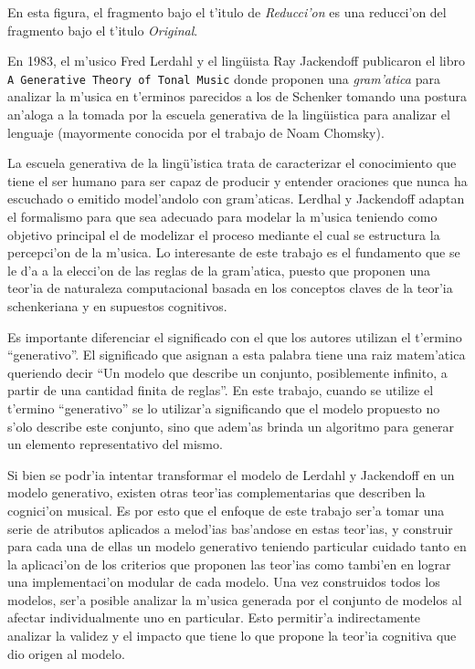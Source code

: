 En esta figura, el fragmento bajo el t'itulo de \emph{Reducci'on} es una reducci'on del fragmento bajo el t'itulo \emph{Original}.

%

En 1983, el m'usico Fred Lerdahl y el ling\"uista Ray Jackendoff publicaron el libro 
\texttt{A Generative Theory of Tonal Music} \citep{LerdahlJackendoff83} donde proponen una \emph{gram'atica} para analizar la m'usica en 
t'erminos parecidos a los de Schenker tomando una postura an'aloga a la tomada por la escuela generativa de la ling\"uistica para analizar el lenguaje 
(mayormente conocida por el trabajo de Noam Chomsky). 

La escuela generativa de la ling\"u'istica trata de caracterizar el conocimiento que tiene el ser humano para ser capaz de producir y entender oraciones 
que nunca ha escuchado o emitido model'andolo con gram'aticas. Lerdhal y Jackendoff adaptan el formalismo para que sea adecuado para modelar la m'usica teniendo
como objetivo principal el de modelizar el proceso mediante el cual se estructura la percepci'on de la m'usica. 
Lo interesante de este trabajo es el fundamento que se le d'a a la elecci'on de las reglas de la gram'atica, puesto que proponen una teor'ia 
de naturaleza computacional basada en los conceptos claves de la teor'ia schenkeriana y en supuestos cognitivos. 

Es importante diferenciar el significado con el que los autores utilizan el t'ermino ``generativo''\citep[p. 6]{LerdahlJackendoff83}. El significado que asignan 
a esta palabra tiene una raiz matem'atica queriendo decir ``Un modelo que describe un conjunto, posiblemente infinito, a partir
de una cantidad finita de reglas''. En este trabajo, cuando se utilize el t'ermino ``generativo'' se lo utilizar'a significando que el modelo propuesto
no s'olo describe este conjunto, sino que adem'as brinda un algoritmo para generar un elemento representativo del mismo.

Si bien se podr'ia intentar transformar el modelo de Lerdahl y Jackendoff en un modelo generativo, existen otras teor'ias complementarias que describen
la cognici'on musical. Es por esto que el enfoque de este trabajo ser'a tomar una serie de atributos aplicados a melod'ias bas'andose en estas teor'ias, 
y construir para cada una de ellas un modelo generativo teniendo particular cuidado
tanto en la aplicaci'on de los criterios que proponen las teor'ias como tambi'en en lograr una implementaci'on modular de cada modelo. 
Una vez construidos todos los modelos, ser'a posible analizar la m'usica generada por el conjunto de modelos al afectar individualmente uno en particular. Esto
permitir'a indirectamente analizar la validez y el impacto que tiene lo que propone la teor'ia cognitiva que dio origen al modelo.

